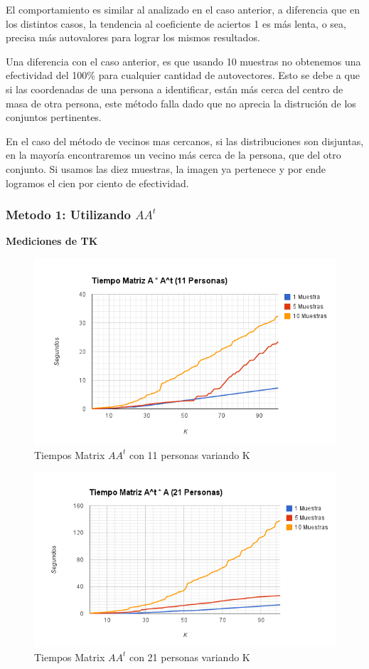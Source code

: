 El comportamiento es similar al analizado en el caso anterior, a diferencia que en los distintos
casos, la tendencia al coeficiente de aciertos 1 es m\'as lenta, o sea, precisa m\'as autovalores
para lograr los mismos resultados.

Una diferencia con el caso anterior, es que usando 10 muestras no obtenemos una efectividad del
100\% para cualquier cantidad de autovectores. Esto se debe a que si las coordenadas de una persona
a identificar, est\'an m\'as cerca del centro de masa de otra persona, este m\'etodo falla dado que
no aprecia la distruci\'on de los conjuntos pertinentes.

En el caso del m\'etodo de vecinos mas cercanos, si las distribuciones son disjuntas, en la mayor\'ia
encontraremos un vecino m\'as cerca de la persona, que del otro conjunto. Si usamos las diez muestras, la imagen ya
pertenece y por ende logramos el cien por ciento de efectividad.


\subsubsection{Metodo 1: Utilizando $AA^t$}

\textbf{Mediciones de TK }

\begin{figure}[H] \includegraphics[width=1\textwidth]{img/imagea.png} \caption{Tiempos Matrix $AA^t$
    con 11 personas variando K} \end{figure}

\begin{figure}[H] \includegraphics[width=1\textwidth]{img/imageb.png} \caption{Tiempos Matrix $AA^t$
    con 21 personas variando K} \end{figure}

